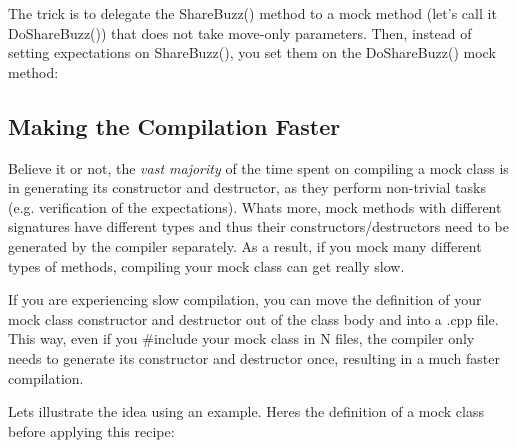 The trick is to delegate the {\ttfamily Share\+Buzz()} method to a mock method (let’s call it {\ttfamily Do\+Share\+Buzz()}) that does not take move-\/only parameters. Then, instead of setting expectations on {\ttfamily Share\+Buzz()}, you set them on the {\ttfamily Do\+Share\+Buzz()} mock method\+:


\begin{DoxyCode}{0}
\DoxyCodeLine{}
\DoxyCodeLine{\textcolor{comment}{// When one calls ShareBuzz() on the MockBuzzer like this, the call is}}
\DoxyCodeLine{\textcolor{comment}{// forwarded to DoShareBuzz(), which is mocked.  Therefore this statement}}
\DoxyCodeLine{\textcolor{comment}{// will trigger the above EXPECT\_CALL.}}
\end{DoxyCode}


\subsection*{Making the Compilation Faster}

Believe it or not, the {\itshape vast majority} of the time spent on compiling a mock class is in generating its constructor and destructor, as they perform non-\/trivial tasks (e.\+g. verification of the expectations). What\textquotesingle{}s more, mock methods with different signatures have different types and thus their constructors/destructors need to be generated by the compiler separately. As a result, if you mock many different types of methods, compiling your mock class can get really slow.

If you are experiencing slow compilation, you can move the definition of your mock class\textquotesingle{} constructor and destructor out of the class body and into a {\ttfamily .cpp} file. This way, even if you {\ttfamily \#include} your mock class in N files, the compiler only needs to generate its constructor and destructor once, resulting in a much faster compilation.

Let\textquotesingle{}s illustrate the idea using an example. Here\textquotesingle{}s the definition of a mock class before applying this recipe\+:


\begin{DoxyCode}{0}
\DoxyCodeLine{}
\DoxyCodeLine{\};}
\end{DoxyCode}


